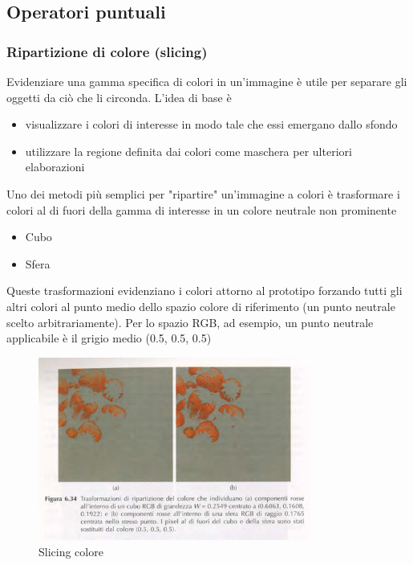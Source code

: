 \documentclass[12pt]{article}
\begin{document}
\subsection{Operatori puntuali}
\subsubsection{Ripartizione di colore (slicing)}
Evidenziare una gamma specifica di colori in un'immagine è utile per separare gli oggetti
da ciò che li circonda. L'idea di base è
\begin{itemize}
    \item visualizzare i colori di interesse in modo tale che essi emergano dallo sfondo
    \item utilizzare la regione definita dai colori come maschera per ulteriori elaborazioni
\end{itemize}
Uno dei metodi più semplici per "ripartire" un'immagine a colori è trasformare i colori al di fuori della gamma di interesse in un colore neutrale non prominente
\begin{itemize}
    \item Cubo
    \item Sfera
\end{itemize}
Queste trasformazioni evidenziano i colori attorno al prototipo forzando tutti gli altri colori al punto medio dello spazio colore di riferimento (un punto neutrale scelto arbitrariamente). Per lo spazio RGB, ad esempio, un punto neutrale applicabile è il grigio medio (0.5, 0.5, 0.5)
\begin{figure}[!htb]
    \centering
    \includegraphics[width=0.8\textwidth]{Images/rip.png}
    \caption{Slicing colore}
\end{figure}
\FloatBarrier
\end{document}
